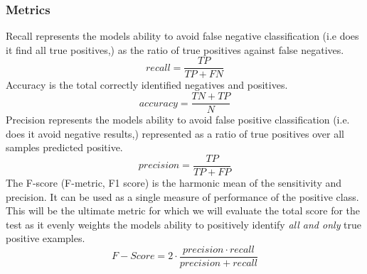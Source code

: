 \subsubsection{Metrics}
Recall represents the models ability to avoid false negative classification (i.e does it find all true positives,) as the ratio of true positives against false negatives.
\begin{equation}
recall = \frac{TP}{TP + FN}
\end{equation}
Accuracy is the total correctly identified negatives and positives.
\begin{equation}
accuracy = \frac{TN + TP}{N}
\end{equation}
Precision represents the models ability to avoid false positive classification (i.e. does it avoid negative results,) represented as a ratio of true positives over all samples predicted positive.
\begin{equation}
precision = \frac{TP}{TP+FP}
\end{equation}
The F-score (F-metric, F1 score) is the harmonic mean of the sensitivity and precision.  It can be used as a single measure of performance of the positive class. This will be the ultimate metric for which we will evaluate the total score for the test as it evenly weights the models ability to positively identify {\it all and only} true positive examples.
\begin{equation}
F-Score = 2\cdot\frac{precision \cdot recall}{precision + recall}
\end{equation}